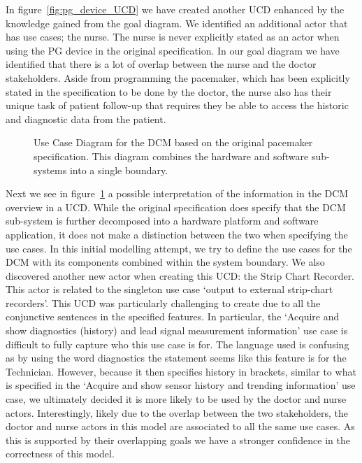 In figure~\ref{fig:pg_device_UCD} we have created another UCD enhanced by the knowledge gained from the goal diagram. We identified an additional actor that has use cases; the nurse. The nurse is never explicitly stated as an actor when using the PG device in the original specification. In our goal diagram we have identified that there is a lot of overlap between the nurse and the doctor stakeholders. Aside from programming the pacemaker, which has been explicitly stated in the specification to be done by the doctor, the nurse also has their unique task of patient follow-up that requires they be able to access the historic and diagnostic data from the patient. 

\begin{figure}
	\centering
	
	\caption{Use Case Diagram for the DCM based on the original pacemaker specification. This diagram combines the hardware and software sub-systems into a single boundary.}
	\label{fig:DCM_UCD_original_spec}
\end{figure}

Next we see in figure~\ref{fig:DCM_UCD_original_spec} a possible interpretation of the information in the DCM overview in a UCD. While the original specification does specify that the DCM sub-system is further decomposed into a hardware platform and software application, it does not make a distinction between the two when specifying the use cases. In this initial modelling attempt, we try to define the use cases for the DCM with its components combined within the system boundary. We also discovered another new actor when creating this UCD: the Strip Chart Recorder. This actor is related to the singleton use case `output to external strip-chart recorders'. This UCD was particularly challenging to create due to all the conjunctive sentences in the specified features. In particular, the `Acquire and show diagnostics (history) and lead signal measurement information' use case is difficult to fully capture who this use case is for. The language used is confusing as by using the word diagnostics the statement seems like this feature is for the Technician. However, because it then specifies history in brackets, similar to what is specified in the `Acquire and show sensor history and trending information' use case, we ultimately decided it is more likely to be used by the doctor and nurse actors. Interestingly, likely due to the overlap between the two stakeholders, the doctor and nurse actors in this model are associated to all the same use cases. As this is supported by their overlapping goals we have a stronger confidence in the correctness of this model.

